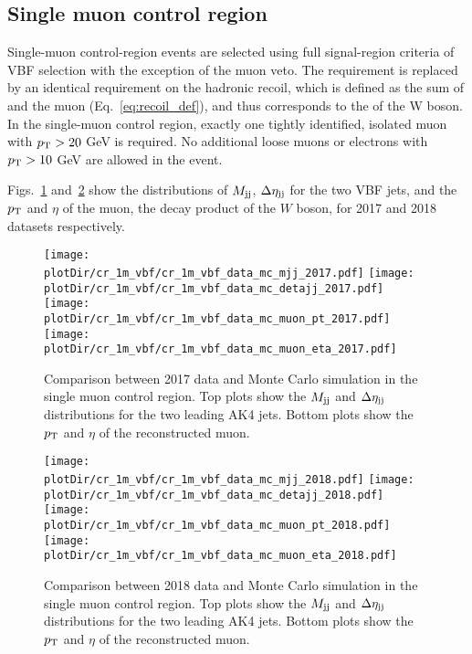 \clearpage

\subsection{Single muon control region}
\label{sec:selection_cr_1m}

Single-muon control-region events are selected using full signal-region criteria of VBF selection with the exception of the muon veto. 
The \ptmiss requirement is replaced by an identical requirement on the hadronic recoil, which is defined as the sum of \ptvecmiss and the muon \vpt (Eq.~\ref{eq:recoil_def}), 
and thus corresponds to the \pt of the W boson.
In the single-muon control region, exactly one tightly identified, isolated muon with $p_{\textrm{T}} > 20$ GeV is required. 
No additional loose muons or electrons with $p_{\textrm{T}} > 10$ GeV are allowed in the event.

Figs.~\ref{fig:cr_1m_vbf_2017_mtr} and~\ref{fig:cr_1m_vbf_2018_mtr} show the distributions of $M_{\textrm{jj}}$, $\Delta \eta_{\textrm{jj}}$ for the two VBF jets,
and the $p_{\textrm{T}}$ and $\eta$ of the muon, the decay product of the $W$ boson, for 2017 and 2018 datasets respectively.

\begin{figure}[htbp]
    \begin{center}
        \texttt{[image: \\plotDir/cr\_1m\_vbf/cr\_1m\_vbf\_data\_mc\_mjj\_2017.pdf]}
        \texttt{[image: \\plotDir/cr\_1m\_vbf/cr\_1m\_vbf\_data\_mc\_detajj\_2017.pdf]} \\
        \texttt{[image: \\plotDir/cr\_1m\_vbf/cr\_1m\_vbf\_data\_mc\_muon\_pt\_2017.pdf]}
        \texttt{[image: \\plotDir/cr\_1m\_vbf/cr\_1m\_vbf\_data\_mc\_muon\_eta\_2017.pdf]}
    \end{center}
    \caption{Comparison between 2017 data and Monte Carlo simulation in the single muon control region. Top plots
        show the $M_{\textrm{jj}}$ and $\Delta \eta_{\textrm{jj}}$ distributions for the two leading AK4 jets. Bottom plots show the $p_{\textrm{T}}$ and $\eta$
        of the reconstructed muon.}
    \label{fig:cr_1m_vbf_2017_mtr}
\end{figure}

\begin{figure}[htbp]
    \begin{center}
        \texttt{[image: \\plotDir/cr\_1m\_vbf/cr\_1m\_vbf\_data\_mc\_mjj\_2018.pdf]}
        \texttt{[image: \\plotDir/cr\_1m\_vbf/cr\_1m\_vbf\_data\_mc\_detajj\_2018.pdf]} \\
        \texttt{[image: \\plotDir/cr\_1m\_vbf/cr\_1m\_vbf\_data\_mc\_muon\_pt\_2018.pdf]}
        \texttt{[image: \\plotDir/cr\_1m\_vbf/cr\_1m\_vbf\_data\_mc\_muon\_eta\_2018.pdf]}
    \end{center}
    \caption{Comparison between 2018 data and Monte Carlo simulation in the single muon control region. Top plots
    show the $M_{\textrm{jj}}$ and $\Delta \eta_{\textrm{jj}}$ distributions for the two leading AK4 jets. Bottom plots show the $p_{\textrm{T}}$ and $\eta$
    of the reconstructed muon.}
    \label{fig:cr_1m_vbf_2018_mtr}
\end{figure}

